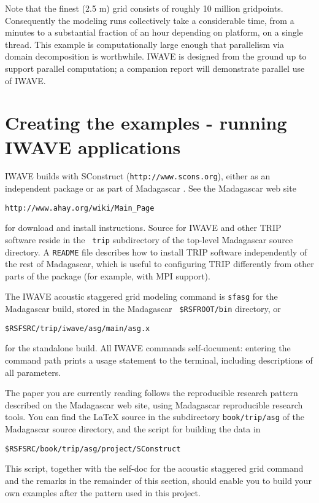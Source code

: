 Note that the finest (2.5 m) grid consists of roughly 10 million
gridpoints. Consequently the modeling runs collectively take a
considerable time, from a minutes to a substantial fraction of an hour
depending on platform,
on a single thread. This example is computationally large enough that
parallelism via domain decomposition is worthwhile. IWAVE is designed
from the ground up to support parallel computation; a companion report
will demonstrate parallel use of IWAVE.

\section{Creating the examples - running IWAVE applications}
IWAVE builds with SConstruct ({\tt http://www.scons.org}), either as an
independent package or as part of Madagascar
\cite[]{Madagascar}. See the Madagascar web site 
\begin{verbatim}  
http://www.ahay.org/wiki/Main_Page
\end{verbatim}
for download and install
instructions. Source for IWAVE and other TRIP software reside in the {\tt
  trip} subdirectory of the top-level Madagascar source directory. A
{\tt README} file describes how to install TRIP software independently
of the rest of Madagascar, which is useful to configuring TRIP
differently from other parts of the package (for example, with MPI support). 

The IWAVE acoustic staggered grid modeling command is
{\tt sfasg} for the Madagascar build, stored in the Madagascar {\tt
  \$RSFROOT/bin} directory, or 
\begin{verbatim}
$RSFSRC/trip/iwave/asg/main/asg.x
\end{verbatim}
for the standalone build. All
IWAVE commands self-document: entering the command path prints a usage
statement to the terminal, including descriptions of all parameters.

The paper you are currently reading follows the reproducible research pattern described on
the Madagascar web site, using Madagascar reproducible research tools. You can find the LaTeX source in the
subdirectory {\tt book/trip/asg} of the Madagascar source directory,
and the script for building the data in 
\begin{verbatim}
$RSFSRC/book/trip/asg/project/SConstruct
\end{verbatim} 
This script, together with the
self-doc for the acoustic staggered grid command and the remarks in
the remainder of this section, should enable you to
build your own examples after the pattern used in this project.

